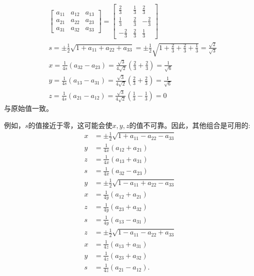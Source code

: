 $$
\begin{aligned}
& \left[\begin{array}{lll}a_{11} & a_{12} & a_{13} \\a_{21} & a_{22} & a_{23} \\a_{31} & a_{32} & a_{33}\end{array}\right]=\left[\begin{array}{ccc}\frac{2}{3} & \frac{1}{3} & \frac{2}{3} \\\frac{1}{3} & \frac{2}{3} & -\frac{2}{3} \\-\frac{2}{3} & \frac{2}{3} & \frac{1}{3}\end{array}\right] \\
& s=\pm \frac{1}{2} \sqrt{1+a_{11}+a_{22}+a_{33}}=\pm \frac{1}{2} \sqrt{1+\frac{2}{3}+\frac{2}{3}+\frac{1}{3}}=\frac{\sqrt{2}}{\sqrt{3}} \\
& x=\frac{1}{4 s}\left(a_{32}-a_{23}\right)=\frac{\sqrt{3}}{4 \sqrt{2}}\left(\frac{2}{3}+\frac{2}{3}\right)=\frac{1}{\sqrt{6}} \\
& y=\frac{1}{4 s}\left(a_{13}-a_{31}\right)=\frac{\sqrt{3}}{4 \sqrt{2}}\left(\frac{2}{3}+\frac{2}{3}\right)=\frac{1}{\sqrt{6}} \\
& z=\frac{1}{4 s}\left(a_{21}-a_{12}\right)=\frac{\sqrt{3}}{4 \sqrt{2}}\left(\frac{1}{3}-\frac{1}{3}\right)=0
\end{aligned}
$$
与原始值一致。

例如，$s$的值接近于零，这可能会使$x, y, z$的值不可靠。因此，其他组合是可用的:
$$
\begin{aligned}
x & =\pm \frac{1}{2} \sqrt{1+a_{11}-a_{22}-a_{33}} \\
y & =\frac{1}{4 x}\left(a_{12}+a_{21}\right) \\
z & =\frac{1}{4 x}\left(a_{13}+a_{31}\right)\\
s & =\frac{1}{4 x}\left(a_{32}-a_{23}\right) \\
y & =\pm \frac{1}{2} \sqrt{1-a_{11}+a_{22}-a_{33}} \\
x & =\frac{1}{4 y}\left(a_{12}+a_{21}\right) \\
z & =\frac{1}{4 y}\left(a_{23}+a_{32}\right) \\
s & =\frac{1}{4 y}\left(a_{13}-a_{31}\right) \\
z & =\pm \frac{1}{2} \sqrt{1-a_{11}-a_{22}+a_{33}} \\
x & =\frac{1}{4 z}\left(a_{13}+a_{31}\right) \\
y & =\frac{1}{4 z}\left(a_{23}+a_{32}\right) \\
s & =\frac{1}{4 z}\left(a_{21}-a_{12}\right) .
\end{aligned}
$$

